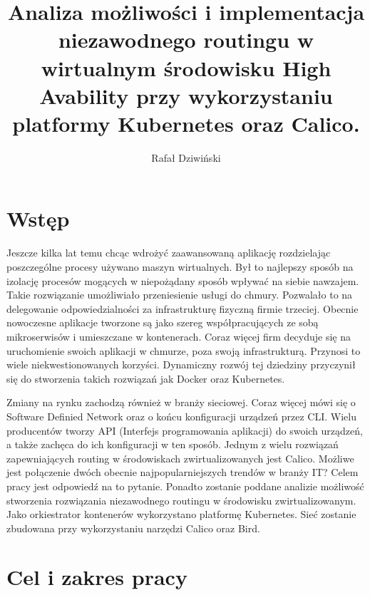 \documentclass[pl,final,oneside]{mgr} %
\author{Rafał Dziwiński}
\title{Analiza możliwości i implementacja niezawodnego routingu w wirtualnym środowisku High Avability przy wykorzystaniu platformy Kubernetes oraz Calico.}
\begin{document}
\maketitle
\tableofcontents

\chapter{Wstęp}
Jeszcze kilka lat temu chcąc wdrożyć zaawansowaną aplikację rozdzielając poszczególne procesy używano maszyn wirtualnych. Był to najlepszy sposób na izolację procesów mogących w niepożądany sposób wpływać na siebie nawzajem. Takie rozwiązanie umożliwiało przeniesienie usługi do chmury. Pozwalało to na delegowanie odpowiedzialności za infrastrukturę fizyczną firmie trzeciej. Obecnie nowoczesne aplikacje tworzone są jako szereg współpracujących ze sobą mikroserwisów i umieszczane w kontenerach. Coraz więcej firm decyduje się na uruchomienie swoich aplikacji w chmurze, poza swoją infrastrukturą. Przynosi to wiele niekwestionowanych korzyści. Dynamiczny rozwój tej dziedziny przyczynił się do stworzenia takich rozwiązań jak Docker oraz Kubernetes.

Zmiany na rynku zachodzą również w branży sieciowej. Coraz więcej mówi się o Software Definied Network oraz o końcu konfiguracji urządzeń przez CLI. Wielu producentów tworzy API (Interfejs programowania aplikacji) do swoich urządzeń, a także zachęca do ich konfiguracji w ten sposób. Jednym z wielu rozwiązań zapewniających routing w środowiskach zwirtualizowanych jest Calico.  Możliwe jest połączenie dwóch obecnie najpopularniejszych trendów w branży IT? Celem pracy jest odpowiedź na to pytanie. Ponadto zostanie poddane analizie możliwość stworzenia rozwiązania niezawodnego routingu w środowisku zwirtualizowanym. Jako orkiestrator kontenerów wykorzystano platformę Kubernetes. Sieć zostanie zbudowana przy wykorzystaniu narzędzi Calico oraz Bird.

\chapter{Cel i zakres pracy}
\end{document}
